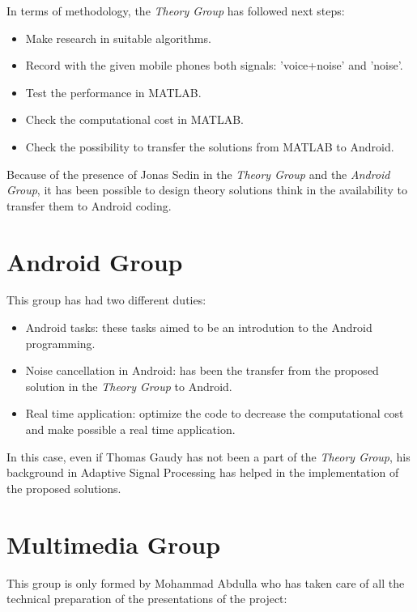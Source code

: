 \documentclass[11pt,a4paper,spanish]{book}  %
\theoremstyle{definition}  %
\theoremstyle{plain}  %
\theoremstyle{remark}  %
\begin{document}
In terms of methodology, the \textit{Theory Group} has followed next steps:

\begin{itemize}
\item Make research in suitable algorithms.
\item Record with the given mobile phones both signals: 'voice+noise' and 'noise'. 
\item Test the performance in MATLAB.
\item Check the computational cost in MATLAB.
\item Check the possibility to transfer the solutions from MATLAB to Android.
\end{itemize}

Because of the presence of Jonas Sedin in the \textit{Theory Group} and the \textit{Android Group}, it has been possible to design theory solutions think in the availability to transfer them to Android coding.\\



	\section{Android Group}
	
	This group has had two different duties:
	
	\begin{itemize}
	\item Android tasks: these tasks aimed to be an introdution to the Android programming.
	\item Noise cancellation in Android: has been the transfer from the proposed solution in the \textit{Theory Group} to Android.
	\item Real time application: optimize the code to decrease the computational cost and make possible a real time application.
	\end{itemize}
	
	In this case, even if Thomas Gaudy has not been a part of the \textit{Theory Group}, his background in Adaptive Signal Processing has helped in the implementation of the proposed solutions.
	
	\section{Multimedia Group}

This group is only formed by Mohammad Abdulla who has taken care of all the technical preparation of the presentations of the project:
\end{document}
